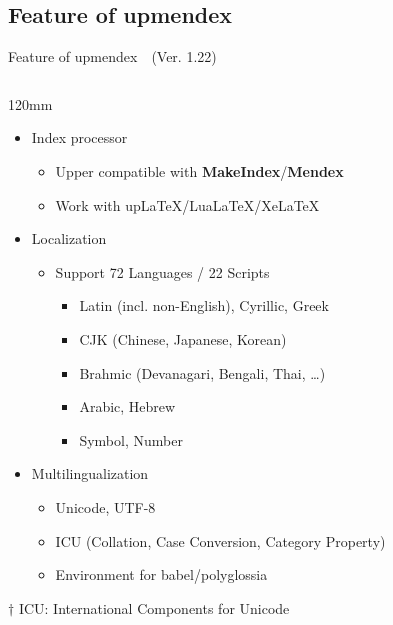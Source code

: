 \documentclass[aspectratio=169,10pt]{beamer}
\begin{document}
\subsection{Feature of upmendex}
\begin{frame}{Feature of upmendex~~{\scriptsize (Ver. 1.22)}}
\renewcommand{\thefootnote}{$\dagger$}
\begin{columns}
\begin{column}{120mm}
\begin{center}
  \begin{itemize}
  \item Index processor
    \begin{itemize}
    \item Upper compatible with \textbf{MakeIndex}/\textbf{Mendex}
    \item Work with upLaTeX/LuaLaTeX/XeLaTeX
    \end{itemize}
  \item Localization
    \begin{itemize}
    \item Support 72 Languages / 22 Scripts
      \begin{itemize}
      \item Latin (incl. non-English), Cyrillic, Greek
      \item CJK (Chinese, Japanese, Korean)
      \item Brahmic (Devanagari, Bengali, Thai, \ldots)
      \item Arabic, Hebrew
      \item Symbol, Number
      \end{itemize}
    \end{itemize}
  \item Multilingualization
    \begin{itemize}
    \item Unicode, UTF-8
    \item ICU\footnotemark{} (Collation, Case Conversion, Category Property)
    \item Environment for babel/polyglossia
    \end{itemize}
  \end{itemize}
\end{center}
\vspace{2mm}
{\footnotesize $\dagger$ ICU: International Components for Unicode}
\end{column}
\end{columns}
\end{frame}
\end{document}
